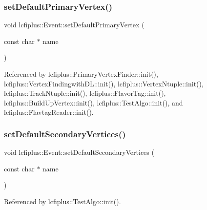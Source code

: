 \mbox{\label{classlcfiplus_1_1Event_af7e191ebef047562f2b0c2f8bcefaf4e}} 
\subsubsection{set\+Default\+Primary\+Vertex()}
{\footnotesize\ttfamily void lcfiplus\+::\+Event\+::set\+Default\+Primary\+Vertex (\begin{DoxyParamCaption}\item[{const char $\ast$}]{name }\end{DoxyParamCaption})\hspace{0.3cm}{\ttfamily [inline]}}



Referenced by lcfiplus\+::\+Primary\+Vertex\+Finder\+::init(), lcfiplus\+::\+Vertex\+Findingwith\+D\+L\+::init(), lcfiplus\+::\+Vertex\+Ntuple\+::init(), lcfiplus\+::\+Track\+Ntuple\+::init(), lcfiplus\+::\+Flavor\+Tag\+::init(), lcfiplus\+::\+Build\+Up\+Vertex\+::init(), lcfiplus\+::\+Test\+Algo\+::init(), and lcfiplus\+::\+Flavtag\+Reader\+::init().

\mbox{\label{classlcfiplus_1_1Event_a88a081cd465016e4f2f8102832ab10e9}} 
\subsubsection{set\+Default\+Secondary\+Vertices()}
{\footnotesize\ttfamily void lcfiplus\+::\+Event\+::set\+Default\+Secondary\+Vertices (\begin{DoxyParamCaption}\item[{const char $\ast$}]{name }\end{DoxyParamCaption})\hspace{0.3cm}{\ttfamily [inline]}}



Referenced by lcfiplus\+::\+Test\+Algo\+::init().

\mbox{\label{classlcfiplus_1_1Event_a6124eb2d97edee392df2b2066be790dd}} 
